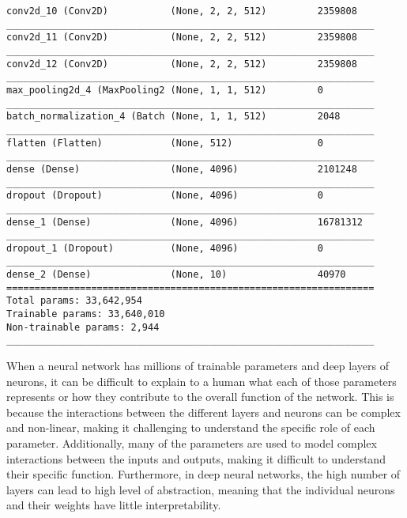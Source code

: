 \begin{lstlisting}[style=kaolstplain,linewidth=1.5\textwidth]
conv2d_10 (Conv2D)           (None, 2, 2, 512)         2359808   
_________________________________________________________________
conv2d_11 (Conv2D)           (None, 2, 2, 512)         2359808   
_________________________________________________________________
conv2d_12 (Conv2D)           (None, 2, 2, 512)         2359808   
_________________________________________________________________
max_pooling2d_4 (MaxPooling2 (None, 1, 1, 512)         0         
_________________________________________________________________
batch_normalization_4 (Batch (None, 1, 1, 512)         2048      
_________________________________________________________________
flatten (Flatten)            (None, 512)               0         
_________________________________________________________________
dense (Dense)                (None, 4096)              2101248   
_________________________________________________________________
dropout (Dropout)            (None, 4096)              0         
_________________________________________________________________
dense_1 (Dense)              (None, 4096)              16781312  
_________________________________________________________________
dropout_1 (Dropout)          (None, 4096)              0         
_________________________________________________________________
dense_2 (Dense)              (None, 10)                40970     
=================================================================
Total params: 33,642,954
Trainable params: 33,640,010
Non-trainable params: 2,944
_________________________________________________________________
\end{lstlisting}

When a neural network has millions of trainable parameters and deep layers of neurons, it can be difficult to explain to a human what each of those parameters represents or how they contribute to the overall function of the network. This is because the interactions between the different layers and neurons can be complex and non-linear, making it challenging to understand the specific role of each parameter. Additionally, many of the parameters are used to model complex interactions between the inputs and outputs, making it difficult to understand their specific function. Furthermore, in deep neural networks, the high number of layers can lead to high level of abstraction, meaning that the individual neurons and their weights have little interpretability.

